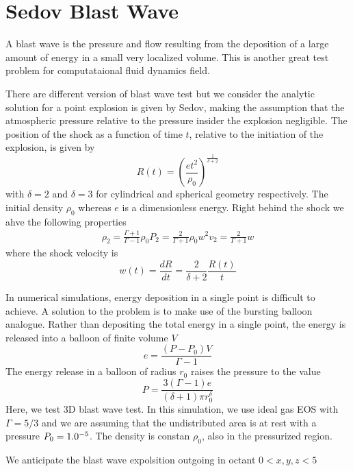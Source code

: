 \documentclass{article}
\begin{document}
\section{Sedov Blast Wave}
A blast wave is the pressure and flow resulting from the deposition of a large amount of energy in a small very localized volume. This is another great test problem for computataional fluid dynamics field. 

There are different version of blast wave test but we consider the analytic solution for a point explosion is given by Sedov, making the assumption that the atmospheric pressure relative to the pressure insider the explosion negligible. The position of the shock as a function of time $t$, relative to the initiation of the explosion, is given by
\begin{equation}
R(t) = \left( \frac{e t^2}{\rho_0} \right)^{\frac{1}{\delta+2}}
\end{equation}
with $\delta = 2$ and $\delta = 3$ for cylindrical and spherical geometry respectively. The initial density $\rho_0$ whereas $e$ is a dimensionless energy. Right behind the shock we ahve the following properties
\begin{align}
\rho_2 = \frac{\Gamma +1}{\Gamma-1} \rho_0
P_2 = \frac{2}{\Gamma+1} \rho_0 w^2
v_2 = \frac{2}{\Gamma+1} w
\end{align}
where the shock velocity is
\begin{equation}
w(t) = \frac{d R}{dt} = \frac{2}{\delta+2} \frac{R(t)}{t}
\end{equation}

In numerical simulations, energy deposition in a single point is difficult to achieve. A solution to the problem is to make use of the bursting balloon analogue. Rather than depositing the total energy in a single point, the energy is released into a balloon of finite volume $V$
\begin{equation}
e = \frac{(P-P_0)V}{\Gamma -1}
\end{equation}
The energy release in a balloon of radius $r_0$ raises the pressure to the value
\begin{equation}
P = \frac{3(\Gamma-1)e}{(\delta+1) \pi r_0^{\delta}}
\end{equation}
Here, we test 3D blast wave test. In this simulation, we use ideal gas EOS with $\Gamma = 5/3$ and we are assuming that the undistributed area is at rest with a pressure $P_0 = 1.0 \time 10^{-5}$. The density is constan $\rho_0$, also in the pressurized region.

We anticipate the blast wave expolsition outgoing in octant $ 0<x,y,z<5$
\end{document}
